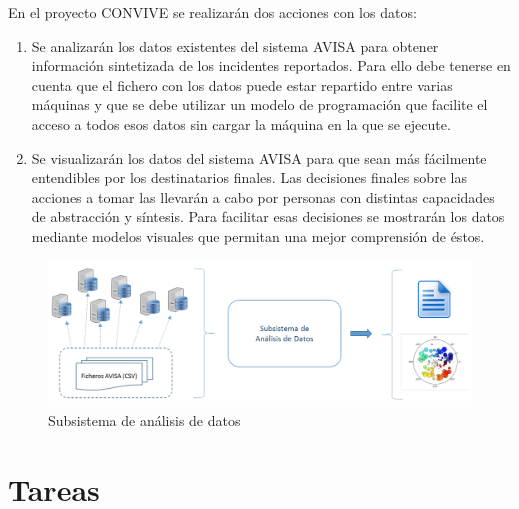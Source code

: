 \documentclass[
  a4paper,
]{scrreport}
\begin{document}
En el proyecto CONVIVE se realizarán dos acciones con los datos:

\begin{enumerate}
\def\labelenumi{\arabic{enumi}.}
\item
  Se analizarán los datos existentes del sistema AVISA para obtener
  información sintetizada de los incidentes reportados. Para ello debe
  tenerse en cuenta que el fichero con los datos puede estar repartido
  entre varias máquinas y que se debe utilizar un modelo de programación
  que facilite el acceso a todos esos datos sin cargar la máquina en la
  que se ejecute.
\item
  Se visualizarán los datos del sistema AVISA para que sean más
  fácilmente entendibles por los destinatarios finales. Las decisiones
  finales sobre las acciones a tomar las llevarán a cabo por personas
  con distintas capacidades de abstracción y síntesis. Para facilitar
  esas decisiones se mostrarán los datos mediante modelos visuales que
  permitan una mejor comprensión de éstos.
\end{enumerate}

\begin{figure}[H]

{\centering \includegraphics{../img/convive/subsistema-analisis-datos.png}

}

\caption{Subsistema de análisis de datos}

\end{figure}%

\section{Tareas}\label{tareas}
\end{document}
